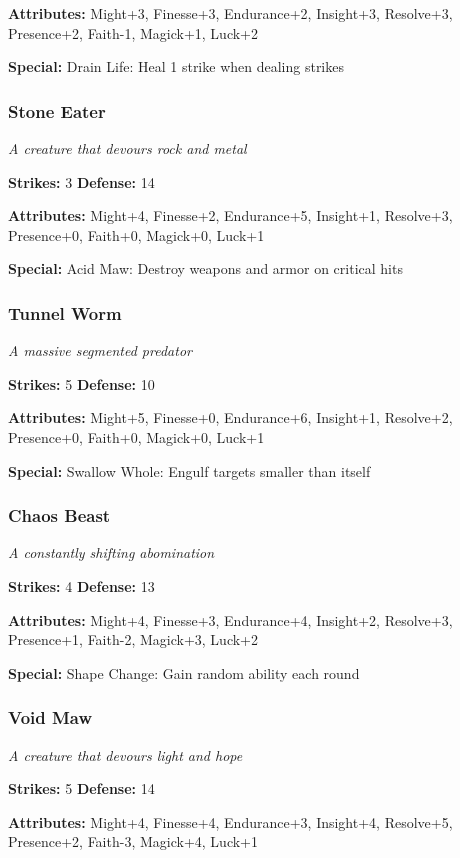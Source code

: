 \documentclass[10pt,twoside]{article}
\begin{document}
\textbf{Attributes:} Might+3, Finesse+3, Endurance+2, Insight+3, Resolve+3, Presence+2, Faith-1, Magick+1, Luck+2

\textbf{Special:} Drain Life: Heal 1 strike when dealing strikes

\subsubsection{Stone Eater}
\textit{A creature that devours rock and metal}

\textbf{Strikes:} 3 \quad \textbf{Defense:} 14

\textbf{Attributes:} Might+4, Finesse+2, Endurance+5, Insight+1, Resolve+3, Presence+0, Faith+0, Magick+0, Luck+1

\textbf{Special:} Acid Maw: Destroy weapons and armor on critical hits

\subsubsection{Tunnel Worm}
\textit{A massive segmented predator}

\textbf{Strikes:} 5 \quad \textbf{Defense:} 10

\textbf{Attributes:} Might+5, Finesse+0, Endurance+6, Insight+1, Resolve+2, Presence+0, Faith+0, Magick+0, Luck+1

\textbf{Special:} Swallow Whole: Engulf targets smaller than itself

\subsubsection{Chaos Beast}
\textit{A constantly shifting abomination}

\textbf{Strikes:} 4 \quad \textbf{Defense:} 13

\textbf{Attributes:} Might+4, Finesse+3, Endurance+4, Insight+2, Resolve+3, Presence+1, Faith-2, Magick+3, Luck+2

\textbf{Special:} Shape Change: Gain random ability each round

\subsubsection{Void Maw}
\textit{A creature that devours light and hope}

\textbf{Strikes:} 5 \quad \textbf{Defense:} 14

\textbf{Attributes:} Might+4, Finesse+4, Endurance+3, Insight+4, Resolve+5, Presence+2, Faith-3, Magick+4, Luck+1
\end{document}
